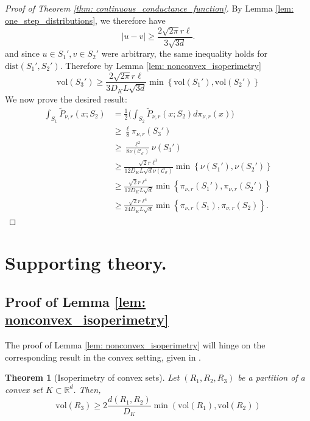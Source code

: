\documentclass{article}
\newcommand{\Reals}{\mathbb{R}}
\newcommand{\abs}[1]{\left \lvert #1 \right \rvert}
\newcommand{\vol}{\mathrm{vol}}
\newcommand{\set}[1]{\left\{#1\right\}}
\newcommand{\Rd}{\Reals^d}
\newcommand{\Cset}{\mathcal{C}}
\newcommand{\Csig}{\Cset_{\sigma}}
\newcommand{\1}{\mathbf{1}}
\theoremstyle{alden}
\theoremstyle{aldenthm}
\newtheorem{theorem}{Theorem}
\theoremstyle{remark}
\begin{document}
\begin{proof}[Proof of Theorem \ref{thm: continuous_conductance_function}]
	By Lemma \ref{lem: one_step_distributions}, we therefore have
	\begin{equation*}
	\abs{u - v} \geq \frac{2 \sqrt{2 \pi} r \ell}{3\sqrt{3 d}}.
	\end{equation*}
	and since $u \in S_1', v \in S_2'$ were arbitrary, the same inequality holds for $\mathrm{dist}(S_1', S_2')$. Therefore by Lemma \ref{lem: nonconvex_isoperimetry}
	\begin{equation*}
	\vol(S_3') \geq  \frac{2 \sqrt{2 \pi} r \ell}{3 D_K L \sqrt{3 d}} \min \set{\vol(S_1'), \vol(S_2')}
	\end{equation*}
	We now prove the desired result:
	\begin{align*}
	\int_{S_1} \widetilde{P}_{\nu,r}(x; S_2) & = \frac{1}{2} \bigl(\int_{S_2} \widetilde{P}_{\nu,r}(x; S_2)  d \pi_{\nu,r}(x) \bigr) \\
	& \geq \frac{\ell}{8} \pi_{\nu,r}(S_3') \\
	& \geq \frac{\ell^2}{8 \nu(\Csig)} \nu(S_3') \\
	& \geq \frac{\sqrt{2} r \ell^3}{12 D_K L \sqrt{d} \nu(\Csig)} \min \set{\nu(S_1'), \nu(S_2')} \\
	& \geq \frac{\sqrt{2} r \ell^4}{12 D_K L \sqrt{d}} \min \set {\pi_{\nu,r}(S_1'), \pi_{\nu,r}(S_2')} \\
	& \geq \frac{\sqrt{2} r \ell^4}{24 D_K L \sqrt{d}} \min \set {\pi_{\nu,r}(S_1), \pi_{\nu,r}(S_2)}.
	\end{align*}
\end{proof}

\section{Supporting theory.}

\subsection{Proof of Lemma \ref{lem: nonconvex_isoperimetry}}
The proof of Lemma \ref{lem: nonconvex_isoperimetry} will hinge on the corresponding result in the convex setting, given in \citep{dyer1991}.

\begin{theorem}[Isoperimetry of convex sets]
	\label{thm: dyer}
	Let $(R_1, R_2, R_3)$ be a partition of a convex set $K \subset \Rd$. Then,
	\begin{equation*}
	\vol(R_3) \geq 2\frac{d(R_1, R_2)}{D_{K}} \min(\vol(R_1), \vol(R_2))
	\end{equation*}
\end{theorem}
\end{document}

